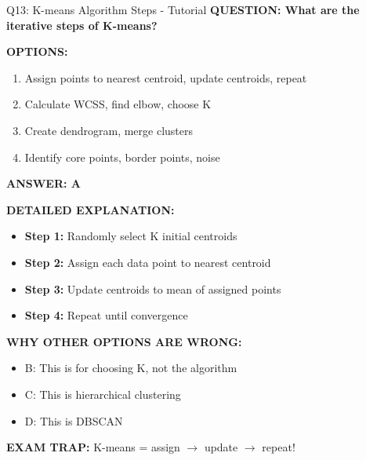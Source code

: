 \documentclass[8pt]{beamer}
\begin{document}
	\begin{frame}{Q13: K-means Algorithm Steps - Tutorial}
		\fontsize{6.5}{7.5}\selectfont
		\textbf{QUESTION: What are the iterative steps of K-means?}
		
		\vspace{0.1cm}
		\textbf{OPTIONS:}
		\begin{enumerate}
			\item Assign points to nearest centroid, update centroids, repeat
			\item Calculate WCSS, find elbow, choose K
			\item Create dendrogram, merge clusters
			\item Identify core points, border points, noise
		\end{enumerate}
		
		\vspace{0.1cm}
		\textcolor{myblue}{\textbf{ANSWER: A}}
		
		\vspace{0.1cm}
		\textbf{DETAILED EXPLANATION:}
		\begin{itemize}
			\item \textbf{Step 1:} Randomly select K initial centroids
			\item \textbf{Step 2:} Assign each data point to nearest centroid
			\item \textbf{Step 3:} Update centroids to mean of assigned points
			\item \textbf{Step 4:} Repeat until convergence
		\end{itemize}
		
		\vspace{0.1cm}
		\textcolor{myred}{\textbf{WHY OTHER OPTIONS ARE WRONG:}}
		\begin{itemize}
			\item \textcolor{myred}{B:} This is for choosing K, not the algorithm
			\item \textcolor{myred}{C:} This is hierarchical clustering
			\item \textcolor{myred}{D:} This is DBSCAN
		\end{itemize}
		
		\textcolor{myred}{\textbf{EXAM TRAP:}} K-means = \textcolor{myblue}{assign $\to$ update $\to$ repeat}!
	\end{frame}
	
\end{document}
